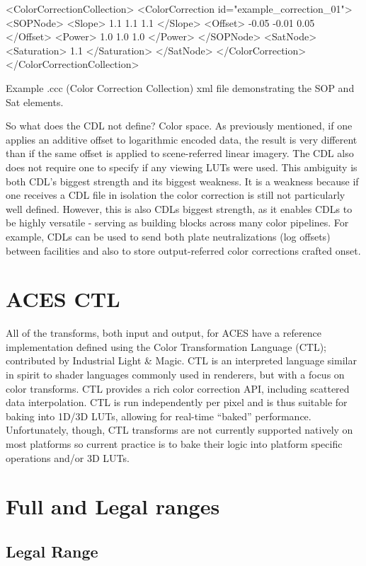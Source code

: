 	<ColorCorrectionCollection>
	<ColorCorrection id="example_correction_01">
			<SOPNode>
		<Slope> 1.1 1.1 1.1 </Slope>
		<Offset> -0.05 -0.01 0.05 </Offset>
		<Power> 1.0 1.0 1.0 </Power>
	</SOPNode>
	<SatNode>
		<Saturation> 1.1 </Saturation>
	</SatNode>
</ColorCorrection>
	</ColorCorrectionCollection>

Example .ccc (Color Correction Collection) xml file demonstrating the SOP and Sat elements.

So what does the CDL not define? Color space. As previously mentioned, if one applies an additive offset to logarithmic encoded data, the result is very different than if the same offset is applied to scene-referred linear imagery. The CDL also does not require one to specify if any viewing LUTs were used. This ambiguity is both CDL’s biggest strength and its biggest weakness. It is a weakness because if one receives a CDL file in isolation the color correction is still not particularly well defined. However, this is also CDLs biggest strength, as it enables CDLs to be highly versatile - serving as building blocks across many color pipelines. For example, CDLs can be used to send both plate neutralizations (log offsets) between facilities and also to store output-referred color corrections crafted onset.

\section{ACES CTL}

All of the transforms, both input and output, for ACES have a reference implementation defined using the Color Transformation Language (CTL); contributed by Industrial Light & Magic. CTL is an interpreted language similar in spirit to shader languages commonly used in renderers, but with a focus on color transforms. CTL provides a rich color correction API, including scattered data interpolation. CTL is run independently per pixel and is thus suitable for baking into 1D/3D LUTs, allowing for real-time “baked” performance. Unfortunately, though, CTL transforms are not currently supported natively on most platforms so current practice is to bake their logic into platform specific operations and/or 3D LUTs.

\section{Full and Legal ranges}

\subsection{Legal Range}

